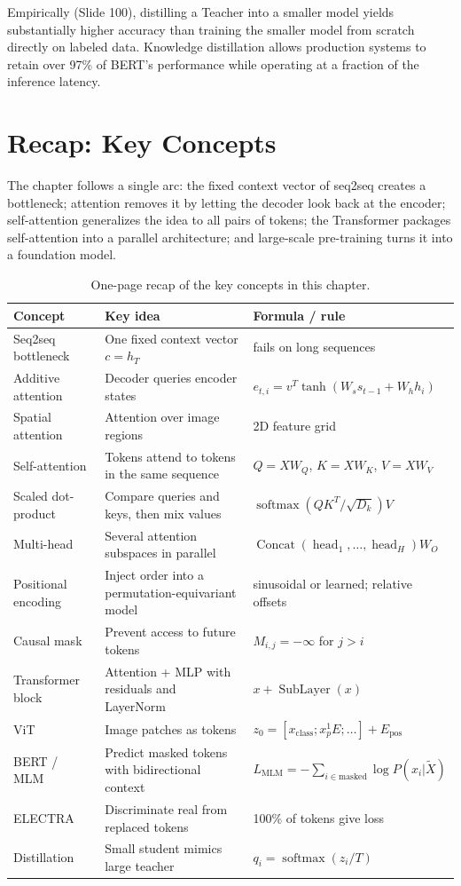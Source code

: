 Empirically (Slide 100), distilling a Teacher into a smaller model yields substantially higher accuracy than training the smaller model from scratch directly on labeled data. Knowledge distillation allows production systems to retain over 97\% of BERT's performance while operating at a fraction of the inference latency.


\section{Recap: Key Concepts}

The chapter follows a single arc: the fixed context vector of seq2seq creates a bottleneck; attention removes it by letting the decoder look back at the encoder; self-attention generalizes the idea to all pairs of tokens; the Transformer packages self-attention into a parallel architecture; and large-scale pre-training turns it into a foundation model.

\begin{table}[htbp]
\centering
\footnotesize
\renewcommand{\arraystretch}{0.95}
\begin{tabular}{p{} p{} p{}}
\toprule
\textbf{Concept} & \textbf{Key idea} & \textbf{Formula / rule} \\
\midrule
Seq2seq bottleneck & One fixed context vector $c=h_T$ & fails on long sequences \\
Additive attention & Decoder queries encoder states & $e_{t,i}=v^T\tanh(W_s s_{t-1}+W_h h_i)$ \\
Spatial attention & Attention over image regions & 2D feature grid \\
Self-attention & Tokens attend to tokens in the same sequence & $Q=XW_Q$, $K=XW_K$, $V=XW_V$ \\
Scaled dot-product & Compare queries and keys, then mix values & $\operatorname{softmax}(QK^T/\sqrt{D_k})V$ \\
Multi-head & Several attention subspaces in parallel & $\operatorname{Concat}(\operatorname{head}_1,\dots,\operatorname{head}_H)W_O$ \\
Positional encoding & Inject order into a permutation-equivariant model & sinusoidal or learned; relative offsets \\
Causal mask & Prevent access to future tokens & $M_{i,j}=-\infty$ for $j>i$ \\
Transformer block & Attention + MLP with residuals and LayerNorm & $x+\operatorname{SubLayer}(x)$ \\
ViT & Image patches as tokens & $z_0=[x_{\text{class}};x_p^1E;\dots]+E_{\text{pos}}$ \\
BERT / MLM & Predict masked tokens with bidirectional context & $L_{\text{MLM}}=-\sum_{i\in\text{masked}}\log P(x_i|\widetilde{X})$ \\
ELECTRA & Discriminate real from replaced tokens & 100\% of tokens give loss \\
Distillation & Small student mimics large teacher & $q_i=\operatorname{softmax}(z_i/T)$ \\
\bottomrule
\end{tabular}
\caption{One-page recap of the key concepts in this chapter.}\label{tab:ch4_recap}
\end{table}

